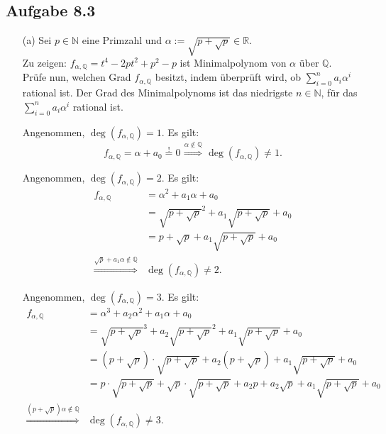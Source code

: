 \documentclass[12pt]{article}
\newcommand{\df}{\enspace\Longrightarrow\enspace}
\newcommand{\grad}{\operatorname{deg}}
\begin{document}
\subsection*{Aufgabe 8.3}
\begin{enumerate}
	\item[(a)] Sei $p\in\mathbb{N}$ eine Primzahl und $\alpha:=\sqrt{p+\sqrt{p}}\in\mathbb{R}$. \\
	Zu zeigen: $f_{\alpha,\mathbb{Q}}=t^4-2pt^2+p^2-p$ ist Minimalpolynom von $\alpha$ über $\mathbb{Q}$. \\
	Prüfe nun, welchen Grad $f_{\alpha,\mathbb{Q}}$ besitzt, indem überprüft wird, ob $\sum_{i=0}^na_i\alpha^i$ rational ist. Der Grad des Minimalpolynoms ist das niedrigste $n\in\mathbb{N}$, für das $\sum_{i=0}^na_i\alpha^i$ rational ist.
	
	Angenommen, $\grad(f_{\alpha,\mathbb{Q}})=1$. Es gilt:
	$$f_{\alpha,\mathbb{Q}}=\alpha+a_0\overset{!}{=}0\overset{\alpha\notin\mathbb{Q}}{\df}\grad(f_{\alpha,\mathbb{Q}})\neq1.$$
	
	Angenommen, $\grad(f_{\alpha,\mathbb{Q}})=2$. Es gilt:
	\begin{align*}
		f_{\alpha,\mathbb{Q}}&=\alpha^2+a_1\alpha+a_0 \\
		&=\sqrt{p+\sqrt{p}}^2+a_1\sqrt{p+\sqrt{p}}+a_0 \\
		&=p+\sqrt{p}+a_1\sqrt{p+\sqrt{p}}+a_0 \\
		\overset{\sqrt{p}+a_1\alpha\notin\mathbb{Q}}{\df}&\grad(f_{\alpha,\mathbb{Q}})\neq2.
	\end{align*}
	
	Angenommen, $\grad(f_{\alpha,\mathbb{Q}})=3$. Es gilt:
	\begin{align*}
		f_{\alpha,\mathbb{Q}}&=\alpha^3+a_2\alpha^2+a_1\alpha+a_0 \\
		&=\sqrt{p+\sqrt{p}}^3+a_2\sqrt{p+\sqrt{p}}^2+a_1\sqrt{p+\sqrt{p}}+a_0 \\
		&=(p+\sqrt{p})\cdot\sqrt{p+\sqrt{p}}+a_2(p+\sqrt{p})+a_1\sqrt{p+\sqrt{p}}+a_0 \\
		&=p\cdot\sqrt{p+\sqrt{p}}+\sqrt{p}\cdot\sqrt{p+\sqrt{p}}+a_2p+a_2\sqrt{p}+a_1\sqrt{p+\sqrt{p}}+a_0 \\
		\overset{(p+\sqrt{p})\alpha\notin\mathbb{Q}}{\df}&\grad(f_{\alpha,\mathbb{Q}})\neq3.
	\end{align*}
	

\end{enumerate}
\end{document}
